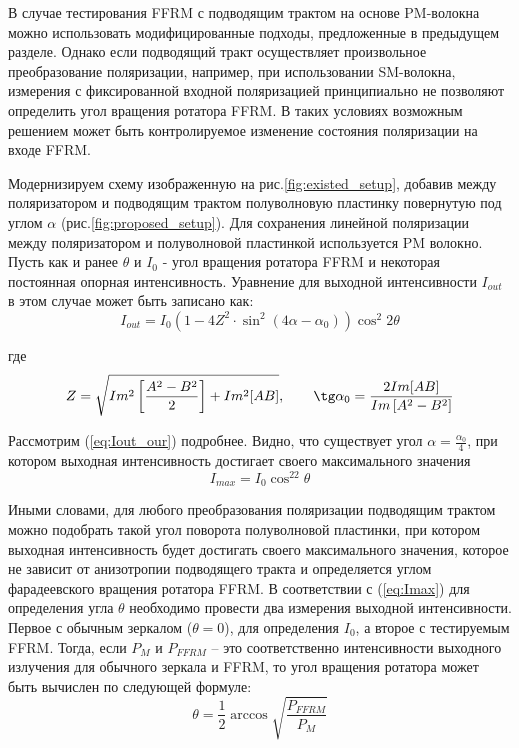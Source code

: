 \documentclass{article}
\begin{document}
В случае тестирования FFRM с подводящим трактом на основе PM-волокна можно использовать модифицированные подходы, предложенные в предыдущем разделе.
Однако если подводящий тракт осуществляет произвольное преобразование поляризации, например, при использовании SM-волокна, измерения с фиксированной входной поляризацией принципиально не позволяют определить угол вращения ротатора FFRM.
В таких условиях возможным решением может быть контролируемое изменение состояния поляризации на входе FFRM.

Модернизируем схему изображенную на рис.\ref{fig:existed_setup}, добавив  между поляризатором и подводящим трактом полуволновую пластинку повернутую под углом $\alpha$ (рис.\ref{fig:proposed_setup}).
Для сохранения линейной поляризации между поляризатором и полуволновой пластинкой используется PM волокно.
Пусть как и ранее $\theta$ и $I_0$ -  угол вращения ротатора FFRM и некоторая постоянная опорная интенсивность.
Уравнение для выходной интенсивности $I_{out}$ в этом случае  может быть записано как:
\begin{equation}
	\label{eq:Iout_our}
	I_{out} =  I_0 \left( 1 - 4 Z^2 \cdot \sin^2(4\alpha - \alpha_0)\right)  \cos^2 2 \theta
\end{equation}

где
\begin{equation}
	Z = \sqrt{Im^2\left[\frac{A^2-B^2}{2}\right]+Im^2[AB]}, \qquad  \tg\alpha_0 = \frac{2Im[AB]}{Im\left[A^2 - B^2\right]}
\end{equation}

Рассмотрим (\ref{eq:Iout_our}) подробнее.
Видно, что существует угол $\alpha = \frac{\alpha_0}{4}$, при котором выходная интенсивность достигает своего максимального значения
\begin{equation}
	\label{eq:Imax}
	I_{max} = I_0\cos^22\theta
\end{equation}

Иными словами, для любого преобразования поляризации подводящим трактом можно подобрать такой угол поворота полуволновой пластинки, при котором выходная интенсивность будет достигать своего максимального значения, которое не зависит от анизотропии подводящего тракта и определяется углом фарадеевского вращения ротатора FFRM.
В соответствии с (\ref{eq:Imax}) для определения угла $\theta$ необходимо провести два измерения выходной интенсивности.
Первое с обычным зеркалом ($\theta=0$), для определения $I_0$, а второе с тестируемым FFRM.
Тогда, если $P_M$ и $P_{FFRM}$ – это соответственно интенсивности выходного излучения для обычного зеркала и FFRM, то угол вращения ротатора может быть вычислен по следующей формуле:
\begin{equation}
	\label{eq:theta}
	\theta=\frac{1}{2}\arccos\sqrt{\frac{P_{FFRM}}{P_M}}
\end{equation}
\end{document}
